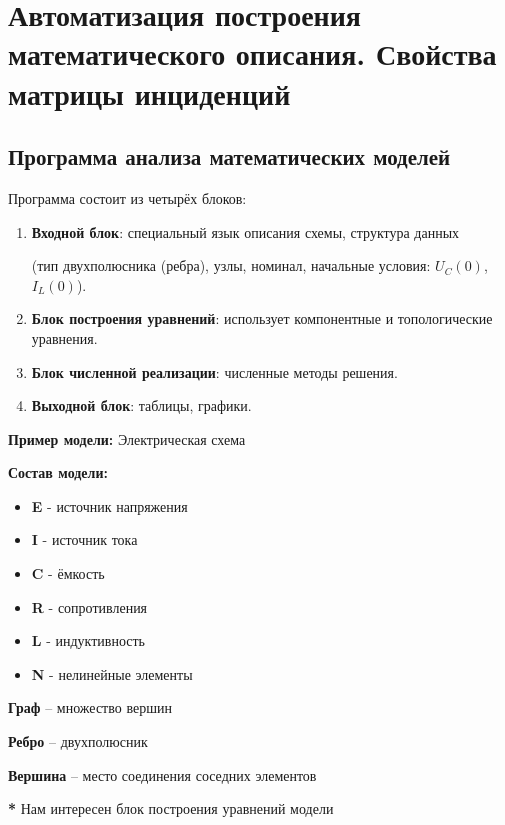	\newpage
	
	\section{Автоматизация построения математического описания. Свойства матрицы инциденций}
	
	\subsection{Программа анализа математических моделей}
	
	Программа состоит из четырёх блоков:
	\begin{enumerate}
		\item \textbf{Входной блок}: специальный язык описания схемы, структура данных \par
		(тип двухполюсника (ребра), узлы, номинал, начальные условия: $U_C(0)$, $I_L(0)$).
		\item \textbf{Блок построения уравнений}: использует компонентные и топологические уравнения.
		\item \textbf{Блок численной реализации}: численные методы решения.
		\item \textbf{Выходной блок}: таблицы, графики.
	\end{enumerate}
	
	\textbf{Пример модели:} Электрическая схема
	\par
	\textbf{Состав модели:}
	\vspace{-1em}
	\begin{itemize}
		\item \textbf{E} - источник напряжения
		\vspace{-1em}
		\item \textbf{I} - источник тока
		\vspace{-1em}
		\item \textbf{C} - ёмкость
		\vspace{-1em}
		\item \textbf{R} - сопротивления
		\vspace{-1em}
		\item \textbf{L} - индуктивность
		\vspace{-1em}
		\item \textbf{N} - нелинейные элементы
	\end{itemize}
	\vspace{-0.5em}
	\textbf{Граф} – множество вершин
	\par
	\textbf{Ребро} – двухполюсник
	\par
	\textbf{Вершина} – место соединения соседних элементов
	\par
	\vspace{0.5em}
	\textbf{*} Нам интересен блоĸ построения уравнений модели
	
